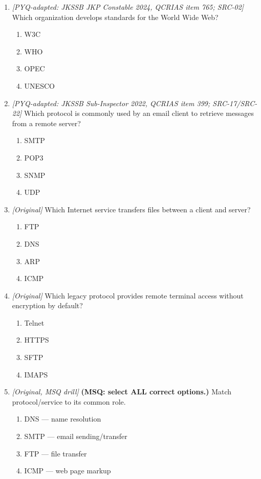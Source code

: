 \begin{enumerate}[label=\textbf{Q\arabic*.}, leftmargin=*]
\begin{enumerate}[label=\Alph*.]
    \item HTML is a printer ink formula.
  \end{enumerate}
\item \textit{[PYQ-adapted: JKSSB JKP Constable 2024, QCRIAS item 765; SRC-02]} Which organization develops standards for the World Wide Web?
  \begin{enumerate}[label=\Alph*.]
\item W3C
   \item WHO
   \item OPEC
   \item UNESCO
  \end{enumerate}

\item \textit{[PYQ-adapted: JKSSB Sub-Inspector 2022, QCRIAS item 399; SRC-17/SRC-22]} Which protocol is commonly used by an email client to retrieve messages from a remote server?
  \begin{enumerate}[label=\Alph*.]
\item SMTP
   \item POP3
   \item SNMP
   \item UDP
  \end{enumerate}

\item \textit{[Original]} Which Internet service transfers files between a client and server?
  \begin{enumerate}[label=\Alph*.]
\item FTP
   \item DNS
   \item ARP
   \item ICMP
  \end{enumerate}

\item \textit{[Original]} Which legacy protocol provides remote terminal access without encryption by default?
  \begin{enumerate}[label=\Alph*.]
\item Telnet
   \item HTTPS
   \item SFTP
   \item IMAPS
  \end{enumerate}

\item \textit{[Original, MSQ drill]} \textbf{(MSQ: select ALL correct options.)} Match protocol/service to its common role.
  \begin{enumerate}[label=\Alph*.]
\item DNS --- name resolution
   \item SMTP --- email sending/transfer
   \item FTP --- file transfer
   \item ICMP --- web page markup
  \end{enumerate}

\end{enumerate}
